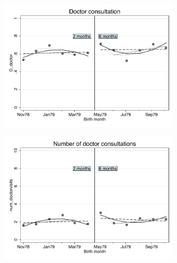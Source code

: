 \documentclass[a4paper ]{article}
\begin{document}
\begin{figure}[p]
\begin{subfigure}[h]{0.48\textwidth}\centering
	\includegraphics[width=\textwidth]{../../analysis/graphs/SOEP/D_doctor_RD.pdf}
\end{subfigure}
\quad
\begin{subfigure}[h]{0.48\textwidth}\centering
	\includegraphics[width=\textwidth]{../../analysis/graphs/SOEP/Docvisits_RD.pdf}
\end{subfigure}




\end{figure}
\end{document}
